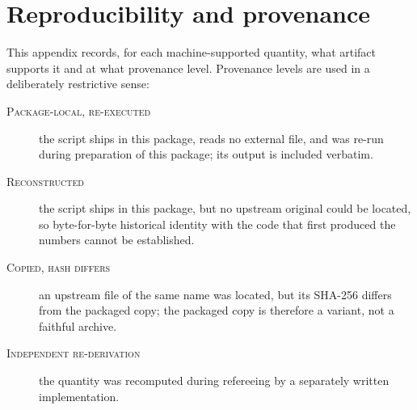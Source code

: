 \section{Reproducibility and provenance}
\label{app:E}

This appendix records, for each machine-supported quantity, what artifact
supports it and at what provenance level. Provenance levels are used in a
deliberately restrictive sense:

\begin{description}
\item[\textsc{Package-local, re-executed}] the script ships in this package,
      reads no external file, and was re-run during preparation of this
      package; its output is included verbatim.
\item[\textsc{Reconstructed}] the script ships in this package, but no
      upstream original could be located, so byte-for-byte historical identity
      with the code that first produced the numbers cannot be established.
\item[\textsc{Copied, hash differs}] an upstream file of the same name was
      located, but its SHA-256 differs from the packaged copy; the packaged
      copy is therefore a variant, not a faithful archive.
\item[\textsc{Independent re-derivation}] the quantity was recomputed during
      refereeing by a separately written implementation.
\end{description}

